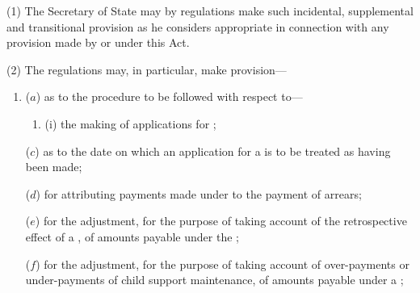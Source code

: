 \documentclass[12pt,a4paper]{article}
\begin{document}
(1) The Secretary of State may by regulations make such incidental, supplemental and transitional provision as he considers appropriate in connection with any provision made by or under this Act.

(2)
The regulations may, in particular, make provision---
\begin{enumerate}\item[]
($a$)
as to the procedure to be followed with respect to---
\begin{enumerate}\item[]
(i)
the making of applications for ;


\end{enumerate}



($c$) as to the date on which an application for a  is to be treated as having been made;

($d$) for attributing payments made under  to the payment of arrears;

($e$) for the adjustment, for the purpose of taking account of the retrospective
effect of a , of amounts
payable under the ;

($f$) for the adjustment, for the purpose of taking account of over-payments or
under-payments of child support maintenance, of amounts payable under
a ;


\end{enumerate}
\end{document}
